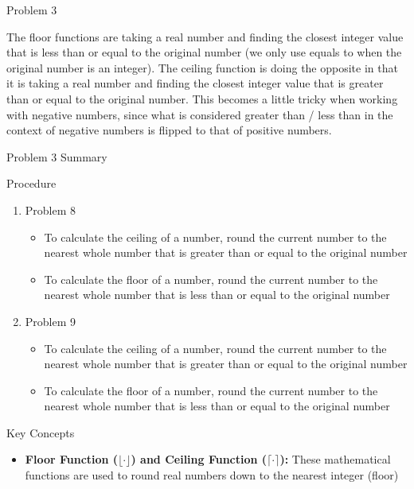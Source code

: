 \begin{problem}{Problem 3}
    \begin{Highlight}[Insights]
        The floor functions are taking a real number and finding the closest integer value that is less than or equal to the original number (we only use equals to when the original number is an integer). 
        The ceiling function is doing the opposite in that it is taking a real number and finding the closest integer value that is greater than or equal to the original number. This becomes a little tricky
        when working with negative numbers, since what is considered greater than / less than in the context of negative numbers is flipped to that of positive numbers.
    \end{Highlight}
\end{problem}

\begin{summary}{Problem 3 Summary}
    \begin{statement}{Procedure}
        \begin{enumerate}[start = 8]
            \item Problem 8
            \begin{itemize}
                \item To calculate the ceiling of a number, round the current number to the nearest whole number that is greater than or equal to the original number
                \item To calculate the floor of a number, round the current number to the nearest whole number that is less than or equal to the original number
            \end{itemize}
            \item Problem 9
            \begin{itemize}
                \item To calculate the ceiling of a number, round the current number to the nearest whole number that is greater than or equal to the original number
                \item To calculate the floor of a number, round the current number to the nearest whole number that is less than or equal to the original number
            \end{itemize}
        \end{enumerate}
    \end{statement}
    \begin{statement}{Key Concepts}
        \begin{itemize}
            \item \textbf{Floor Function ($\lfloor \cdot \rfloor$) and Ceiling Function ($\lceil \cdot \rceil$):} These mathematical functions are used to round real numbers down to the nearest integer (floor) 

\end{itemize}
\end{statement}
\end{summary}
